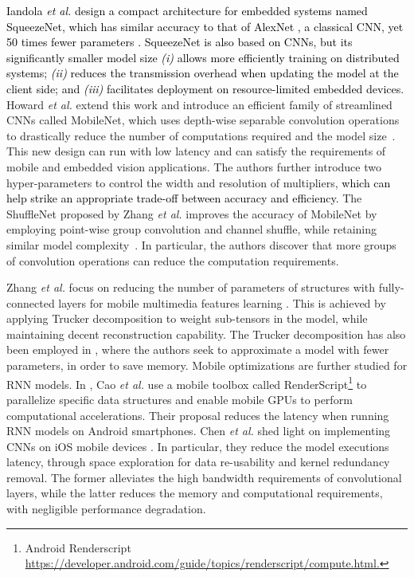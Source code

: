 \documentclass[journal,comsoc,letter]{IEEEtran}
\newcommand{\edit}[1]{\textcolor{black}{#1}}
\begin{document}
\edit{Iandola \emph{et al.} design a compact architecture for embedded systems named SqueezeNet, which has similar accuracy to that of AlexNet \cite{krizhevsky2012imagenet}, a classical CNN, yet 50 times fewer parameters \cite{iandola2017squeezenet}. SqueezeNet is also based on CNNs, but its significantly smaller model size \emph{(i)} allows more efficiently training on distributed systems; \emph{(ii)} reduces the transmission overhead when updating the model at the client side; and \emph{(iii)} facilitates deployment on resource-limited embedded devices.} Howard \emph{et al.} extend this work and introduce an efficient family of streamlined CNNs called MobileNet, which uses depth-wise separable convolution operations to drastically reduce the number of computations required and the model size~\cite{howard2017mobilenets}. This new design can run with low latency and can satisfy the requirements of mobile and embedded vision applications. The authors further introduce two hyper-parameters to control the  width and resolution of multipliers, \edit{which can help strike an appropriate trade-off between accuracy and efficiency.} The ShuffleNet proposed by Zhang \emph{et al.} improves the accuracy of MobileNet by employing point-wise group convolution and channel shuffle, while retaining similar model complexity~\cite{zhang2017shufflenet}. In particular, the authors discover that more groups of convolution operations can reduce the computation requirements. 

Zhang \emph{et al.} focus on reducing the number of parameters of structures with fully-connected layers for mobile multimedia features learning \cite{zhang2017tucker}. This is achieved by applying Trucker decomposition to weight sub-tensors in the model, while maintaining decent reconstruction capability. The Trucker decomposition has also been employed in \cite{huynh2017deepmon}, where the authors seek to approximate a model with fewer parameters, in order to save memory. Mobile optimizations are further studied for RNN models. In \cite{cao2017mobirnn}, Cao \emph{et al.} use a mobile toolbox called RenderScript\footnote{Android Renderscript \url{https://developer.android.com/guide/topics/renderscript/compute.html.}} to parallelize specific data structures and enable mobile GPUs to perform computational accelerations. Their proposal reduces the latency when running RNN models on Android smartphones. Chen \emph{et al.} shed light on implementing CNNs on iOS mobile devices \cite{chen2016deep}. In particular, they reduce the model executions latency, through space exploration for data re-usability and kernel redundancy removal. The former alleviates the high bandwidth requirements of convolutional layers, while the latter reduces the memory and computational requirements, with negligible performance degradation. 
\end{document}
